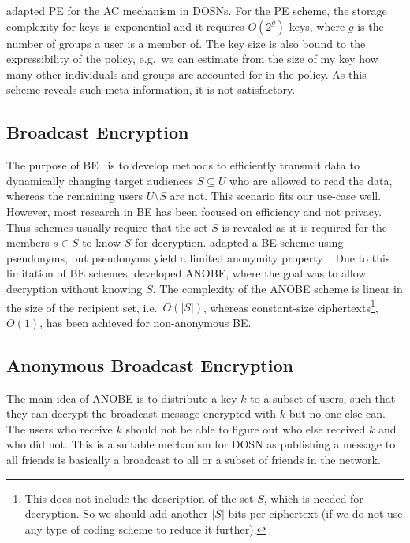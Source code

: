 \citet{PEAC} adapted \ac{PE} for the \ac{AC} mechanism in \acp{DOSN}.
For the \ac{PE} scheme, the storage complexity for keys is exponential and it 
requires \(O(2^g)\) keys, where \(g\) is the number of groups a user is 
a member of.
The key size is also bound to the expressibility of the policy, e.g.\ we can 
estimate from the size of my key how many other individuals and groups are 
accounted for in the policy.
As this scheme reveals such meta-information, it is not satisfactory.

\subsection{Broadcast Encryption}\label{sec:BE}

The purpose of \ac{BE}~\cite{broadcastenc} is to develop methods to 
efficiently transmit data to dynamically changing target audiences 
\(S\subseteq U\) who are allowed to read the data, whereas the remaining users 
\(U\setminus S\) are not.
This scenario fits our use-case well.
However, most research in \ac{BE} has been focused on efficiency and not privacy.
Thus schemes usually require that the set \(S\) is revealed as it is required 
for the members \(s\in S\) to know \(S\) for decryption.
\citet{PseudonymousBE} adapted a \ac{BE} scheme using pseudonyms, but 
pseudonyms yield a limited anonymity property~\cite{PseudonymousBE}.
Due to this limitation of \ac{BE} schemes, \citet{ANOBE} developed \ac{ANOBE}, 
where the goal was to allow decryption without knowing \(S\).
The complexity of the \ac{ANOBE} scheme is linear in the size of the recipient 
set, i.e.~\(O(|S|)\), whereas constant-size ciphertexts\footnote{%
  This does not include the description of the set \(S\), which is needed for 
  decryption.
  So we should add another \(|S|\) bits per ciphertext (if we do not use any 
  type of coding scheme to reduce it further).
}, \(O(1)\), has been achieved for non-anonymous \ac{BE}.

\subsection{Anonymous Broadcast Encryption}\label{sec:ANOBE}

The main idea of \ac{ANOBE} is to distribute a key \(k\) to a subset of users, 
such that they can decrypt the broadcast message encrypted with \(k\) but no 
one else can.
The users who receive \(k\) should not be able to figure out who else received 
\(k\) and who did not.
This is a suitable mechanism for \ac{DOSN} as publishing a message to all 
friends is basically a broadcast to all or a subset of friends in the network.

